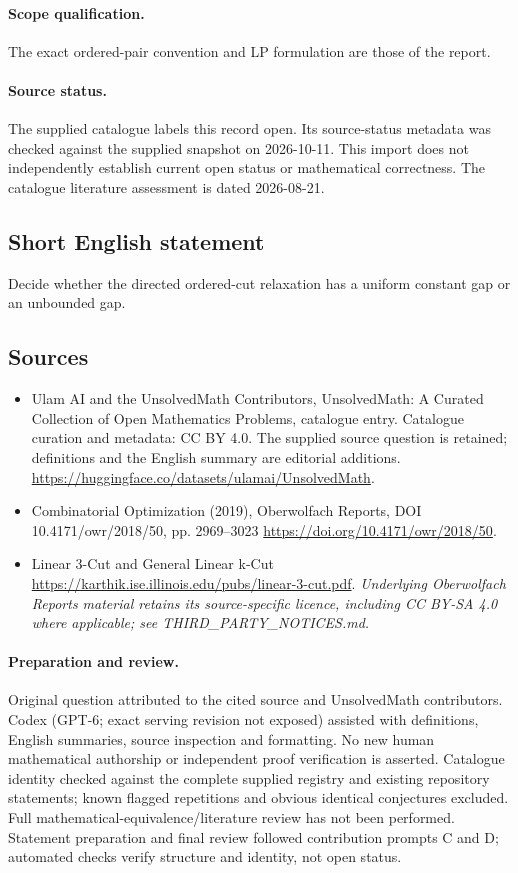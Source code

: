 \documentclass[11pt]{article}
\begin{document}
\paragraph{Scope qualification.}
The exact ordered-pair convention and LP formulation are those of the report.
\paragraph{Source status.}
The supplied catalogue labels this record open. Its source-status metadata was checked against the supplied snapshot on 2026-10-11. This import does not independently establish current open status or mathematical correctness. The catalogue literature assessment is dated 2026-08-21.
\subsection{Short English statement}
Decide whether the directed ordered-cut relaxation has a uniform constant gap or an unbounded gap.
\subsection{Sources}
\begin{itemize}
\item[S1] Ulam AI and the UnsolvedMath Contributors, UnsolvedMath: A Curated Collection of Open Mathematics Problems, catalogue entry. Catalogue curation and metadata: CC BY 4.0. The supplied source question is retained; definitions and the English summary are editorial additions.
\url{https://huggingface.co/datasets/ulamai/UnsolvedMath}.
\item[S2] Combinatorial Optimization (2019), Oberwolfach Reports, DOI 10.4171/owr/2018/50, pp. 2969--3023
\url{https://doi.org/10.4171/owr/2018/50}.
\item[S3] Linear 3-Cut and General Linear k-Cut
\url{https://karthik.ise.illinois.edu/pubs/linear-3-cut.pdf}.
\textit{Underlying Oberwolfach Reports material retains its source-specific licence, including CC BY-SA 4.0 where applicable; see THIRD\_PARTY\_NOTICES.md.}
\end{itemize}
\paragraph{Preparation and review.}
Original question attributed to the cited source and UnsolvedMath contributors. Codex (GPT-6; exact serving revision not exposed) assisted with definitions, English summaries, source inspection and formatting. No new human mathematical authorship or independent proof verification is asserted. Catalogue identity checked against the complete supplied registry and existing repository statements; known flagged repetitions and obvious identical conjectures excluded. Full mathematical-equivalence/literature review has not been performed. Statement preparation and final review followed contribution prompts C and D; automated checks verify structure and identity, not open status.
\label{end:statement}
\end{document}
